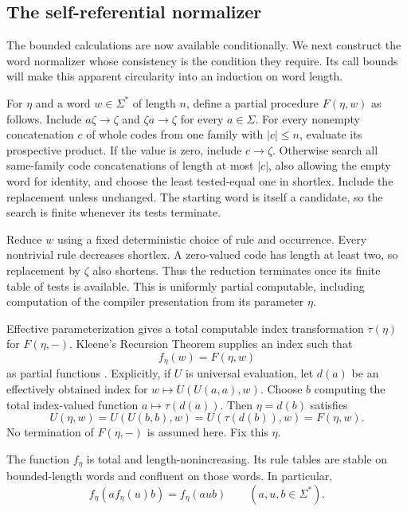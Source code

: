 \subsection{The self-referential normalizer}

The bounded calculations are now available conditionally.
We next construct the word normalizer whose consistency is the
condition they require. Its call bounds will make this apparent
circularity into an induction on word length.

For $\eta$ and a word $w\in\Sigma^*$ of length $n$,
define a partial procedure $F(\eta,w)$ as follows.
Include $a\zeta\to\zeta$ and $\zeta a\to\zeta$ for
every $a\in\Sigma$.  For every nonempty concatenation
$c$ of whole codes from one family with $|c|\leq n$,
evaluate its prospective product.  If the value is
zero, include $c\to\zeta$.  Otherwise search all
same-family code concatenations of length at most
$|c|$, also allowing the empty word for identity,
and choose the least tested-equal one in shortlex.
Include the replacement unless unchanged.  The
starting word is itself a candidate, so the search
is finite whenever its tests terminate.

Reduce $w$ using a fixed deterministic choice of
rule and occurrence.  Every nontrivial rule decreases
shortlex.  A zero-valued code has length at least
two, so replacement by $\zeta$ also shortens.
Thus the reduction terminates once its finite
table of tests is available.  This is uniformly
partial computable, including computation of the
compiler presentation from its parameter $\eta$.

Effective parameterization gives a total computable
index transformation $\tau(\eta)$ for $F(\eta,-)$.
Kleene's Recursion Theorem supplies an index such that
\begin{equation}\label{eq:encoding-fixed-point}
 f_\eta(w)=F(\eta,w)
\end{equation}
as partial functions \citep[\S~2, p.~153]{Kleene38}.
Explicitly, if $U$ is universal evaluation, let
$d(a)$ be an effectively obtained index for
$w\mapsto U(U(a,a),w)$.  Choose $b$ computing
the total index-valued function $a\mapsto\tau(d(a))$.
Then $\eta=d(b)$ satisfies
\[
 U(\eta,w)=U(U(b,b),w)
          =U(\tau(d(b)),w)=F(\eta,w).
\]
No termination of $F(\eta,-)$ is assumed here.
Fix this $\eta$.

\begin{lemma}\label{lem:encoding-bootstrap}
The function $f_\eta$ is total and length-nonincreasing.
Its rule tables are stable on bounded-length words and
confluent on those words.  In particular,
\begin{equation}\label{eq:encoding-context-law}
 f_\eta(a f_\eta(u)b)=f_\eta(aub)
 \qquad(a,u,b\in\Sigma^*).
\end{equation}
\end{lemma}

